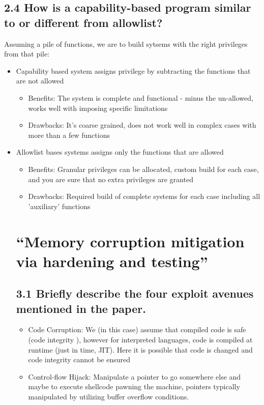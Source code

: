 \documentclass[
	letterpaper, %
	10pt, %
	unnumberedsections, %
	twoside, %
]{LTJournalArticle}
\begin{document}
\subsection{2.4 How is a capability-based program similar to or different from allowlist?}
Assuming a pile of functions, we are to build sytsems with the right privileges from that pile:
\begin{itemize}
	\item Capability based system assigns privilege by subtracting the functions that are not allowed
	\begin{itemize}
		\item Benefits: The system is complete and functional - minus the un-allowed, works well with imposing specific limitations
		\item Drawbacks: It's coarse grained, does not work well in complex cases with more than a few functions 
	\end{itemize}
	\item Allowlist bases systems assigns only the functions that are allowed   
	\begin{itemize}
		\item Benefits: Granular privileges can be allocated, custom build for each case, and you are sure that no extra privileges are granted
		\item Drawbacks: Required build of complete systems for each case including all 'auxiliary' functions 
	\end{itemize}


\section{“Memory corruption mitigation via hardening and testing”} 

\subsection{3.1 Briefly describe the four exploit avenues mentioned in the paper.}
\begin{itemize}
	\item Code Corruption: We (in this case) assume that compiled code is safe (code integrity \faThumbsOUp), however for interpreted languages, code is compiled at runtime (just in time, JIT). Here it is possible that code is changed and code integrity cannot be ensured
\end{itemize}

\begin{itemize}
	\item Control-flow Hijack: Manipulate a pointer to go somewhere else and maybe to execute shellcode pawning the machine, pointers typically manipulated by utilizing buffer overflow conditions.    
\end{itemize}


\end{itemize}
\end{document}
